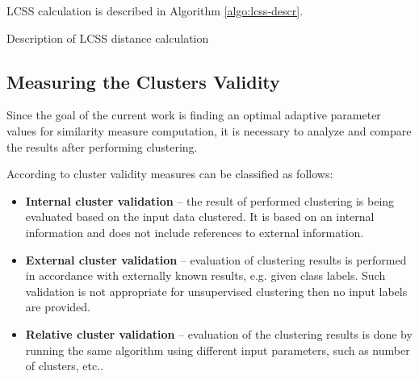 
LCSS calculation is described in Algorithm \ref{algo:lcss-descr}.

\begin{algorithm}
	\caption{Description of LCSS distance calculation}
	\label{algo:lcss-descr}
	\SetAlgoLined
\end{algorithm}

\subsection{Measuring the Clusters Validity}

Since the goal of the current work is finding an optimal adaptive parameter values for similarity measure computation, it is necessary to analyze and compare the results after performing clustering. 

According to \cite{online:dunn_cl_valid} cluster validity measures can be classified as follows:
\begin{itemize}
	\item \textbf{Internal cluster validation} -- the result of performed clustering is being evaluated based on the input data clustered. It is based on an internal information and does not include references to external information.
	\item \textbf{External cluster validation} -- evaluation of clustering results is performed in accordance with externally known results, e.g. given class labels. Such validation is not appropriate for unsupervised clustering then no input labels are provided.
	\item \textbf{Relative cluster validation} -- evaluation of the clustering results is done by running the same algorithm using different input parameters, such as number of clusters, etc..
\end{itemize}

